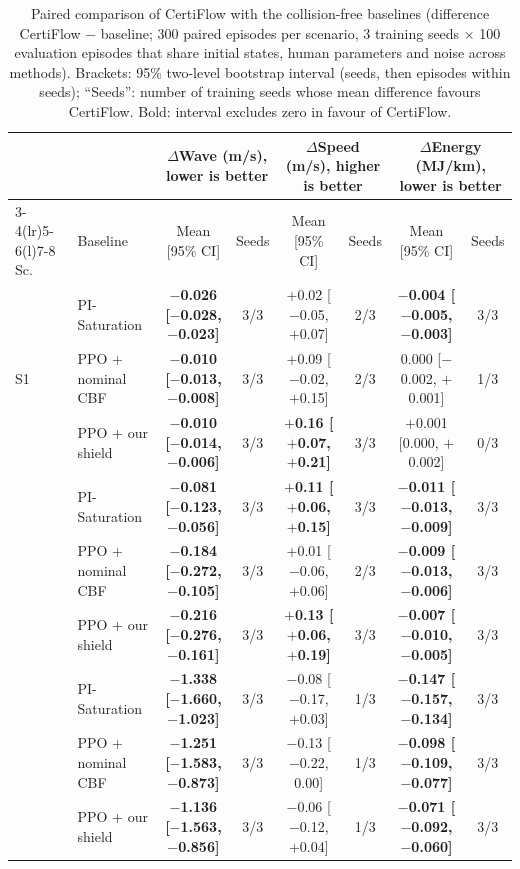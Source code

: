 \begin{table}[!t]
\caption{Paired comparison of CertiFlow with the collision-free baselines (difference CertiFlow $-$ baseline; 300 paired episodes per scenario, 3 training seeds $\times$ 100 evaluation episodes that share initial states, human parameters and noise across methods). Brackets: 95\% two-level bootstrap interval (seeds, then episodes within seeds); ``Seeds'': number of training seeds whose mean difference favours CertiFlow. Bold: interval excludes zero in favour of CertiFlow.}\label{tab:stats}
\centering\footnotesize
\setlength{\tabcolsep}{3.2pt}
\begin{tabular*}{\textwidth}{@{\extracolsep{\fill}}ll cc cc cc@{}}
\toprule
 & & \multicolumn{2}{c}{$\Delta$Wave (m/s), lower is better} & \multicolumn{2}{c}{$\Delta$Speed (m/s), higher is better} & \multicolumn{2}{c}{$\Delta$Energy (MJ/km), lower is better}\\
\cmidrule(lr){3-4}\cmidrule(lr){5-6}\cmidrule(l){7-8}
Sc. & Baseline & Mean [95\% CI] & Seeds & Mean [95\% CI] & Seeds & Mean [95\% CI] & Seeds\\
\midrule
\multirow{3}{*}{S1} & PI-Saturation & \textbf{$-$0.026 [$-$0.028, $-$0.023]} & 3/3 & $+$0.02 [$-$0.05, $+$0.07] & 2/3 & \textbf{$-$0.004 [$-$0.005, $-$0.003]} & 3/3\\
 & PPO + nominal CBF & \textbf{$-$0.010 [$-$0.013, $-$0.008]} & 3/3 & $+$0.09 [$-$0.02, $+$0.15] & 2/3 & 0.000 [$-$0.002, $+$0.001] & 1/3\\
 & PPO + our shield & \textbf{$-$0.010 [$-$0.014, $-$0.006]} & 3/3 & \textbf{$+$0.16 [$+$0.07, $+$0.21]} & 3/3 & $+$0.001 [0.000, $+$0.002] & 0/3\\
\addlinespace[2pt]
\multirow{3}{*}{S2} & PI-Saturation & \textbf{$-$0.081 [$-$0.123, $-$0.056]} & 3/3 & \textbf{$+$0.11 [$+$0.06, $+$0.15]} & 3/3 & \textbf{$-$0.011 [$-$0.013, $-$0.009]} & 3/3\\
 & PPO + nominal CBF & \textbf{$-$0.184 [$-$0.272, $-$0.105]} & 3/3 & $+$0.01 [$-$0.06, $+$0.06] & 2/3 & \textbf{$-$0.009 [$-$0.013, $-$0.006]} & 3/3\\
 & PPO + our shield & \textbf{$-$0.216 [$-$0.276, $-$0.161]} & 3/3 & \textbf{$+$0.13 [$+$0.06, $+$0.19]} & 3/3 & \textbf{$-$0.007 [$-$0.010, $-$0.005]} & 3/3\\
\addlinespace[2pt]
\multirow{3}{*}{S3} & PI-Saturation & \textbf{$-$1.338 [$-$1.660, $-$1.023]} & 3/3 & $-$0.08 [$-$0.17, $+$0.03] & 1/3 & \textbf{$-$0.147 [$-$0.157, $-$0.134]} & 3/3\\
 & PPO + nominal CBF & \textbf{$-$1.251 [$-$1.583, $-$0.873]} & 3/3 & $-$0.13 [$-$0.22, 0.00] & 1/3 & \textbf{$-$0.098 [$-$0.109, $-$0.077]} & 3/3\\
 & PPO + our shield & \textbf{$-$1.136 [$-$1.563, $-$0.856]} & 3/3 & $-$0.06 [$-$0.12, $+$0.04] & 1/3 & \textbf{$-$0.071 [$-$0.092, $-$0.060]} & 3/3\\
\bottomrule
\end{tabular*}
\end{table}
